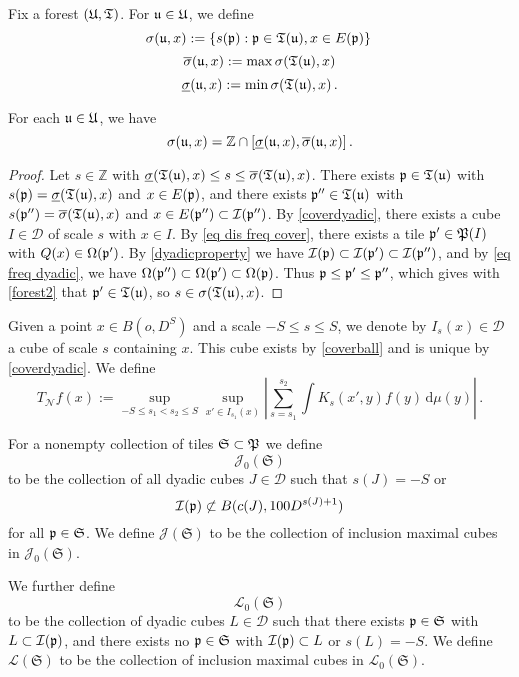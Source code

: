 Fix a forest $(\mathfrak U, \mathfrak T)$.
For $\mathfrak u \in \mathfrak U$, we define
$$
    \sigma (\mathfrak u, x):=\{s(\mathfrak p):\mathfrak p\in \mathfrak T(\mathfrak u), x\in E(\mathfrak p)\}\,
$$
$$
    \overline{\sigma} (\mathfrak u, x) := \max \sigma(\mathfrak T(\mathfrak u), x)
$$
$$
    \underline{\sigma} (\mathfrak u, x) := \min\sigma(\mathfrak T(\mathfrak u), x)\,.
$$
\begin{lemma}
\label{lem sigma convex}
    For each $\mathfrak u \in \mathfrak U$, we have
    $$
        \sigma(\mathfrak u, x) = \mathbb{Z} \cap [\underline{\sigma} (\mathfrak u, x), \overline{\sigma} (\mathfrak u, x)]\,.
    $$
\end{lemma}

\begin{proof}
    Let $s \in \mathbb{Z}$ with $\underline{\sigma} (\mathfrak T(\mathfrak u), x) \le s \le \overline{\sigma} (\mathfrak T(\mathfrak u), x)$. There exists $\mathfrak p \in \mathfrak T(\mathfrak u)$ with $s(\mathfrak p) = \underline{\sigma} (\mathfrak T(\mathfrak u), x)$ and $x \in E(\mathfrak p)$, and there exists $\mathfrak p'' \in \mathfrak T(\mathfrak u)$ with $s(\mathfrak p'') = \overline{\sigma} (\mathfrak T(\mathfrak u), x)$ and $x \in E(\mathfrak p'') \subset \mathcal{I}(\mathfrak p'')$. By \eqref{coverdyadic}, there exists a cube $I \in \mathcal{D}$ of scale $s$ with $x \in I$. By \eqref{eq dis freq cover}, there exists a tile $\mathfrak p' \in \mathfrak P(I)$ with $Q(x) \in \Omega(\mathfrak p')$. By \eqref{dyadicproperty}  we have $\mathcal{I}(\mathfrak p) \subset \mathcal{I}(\mathfrak p') \subset \mathcal{I}(\mathfrak p'')$, and by \eqref{eq freq dyadic}, we have $\Omega(\mathfrak p'') \subset \Omega(\mathfrak p') \subset \Omega(\mathfrak p)$. Thus $\mathfrak p \le \mathfrak p' \le\mathfrak p''$, which gives with \eqref{forest2} that $\mathfrak p' \in \mathfrak T(\mathfrak u)$, so $s \in \sigma(\mathfrak T(\mathfrak u), x)$.
\end{proof}

Given a point $x \in B(o, D^S)$ and a scale $-S \le s\le S$, we denote by $I_s(x) \in \mathcal{D}$ a cube of scale $s$ containing $x$. This cube exists by \eqref{coverball} and is unique by \eqref{coverdyadic}. We define
\begin{equation}
    \label{eq TN def}
    T_{\mathcal{N}} f(x) := \sup_{-S \le s_1 < s_2 \le S} \sup_{x' \in I_{s_1}(x)} \left| \sum_{s = s_1}^{s_2}  \int K_s(x',y) f(y)  \, \mathrm{d}\mu(y) \right|\,.
\end{equation}

For a nonempty collection of tiles $\mathfrak{S} \subset \mathfrak P$ we define
$$
    \mathcal{J}_0(\mathfrak{S})
$$
to be the collection of all dyadic cubes $J \in \mathcal{D}$ such that $s(J) = -S$ or
$$
    \mathcal{I}(\mathfrak p) \not\subset B(c(J), 100D^{s(J) + 1})
$$
for all $\mathfrak p \in \mathfrak{S}$. We define $\mathcal{J}(\mathfrak{S})$ to be the collection of inclusion maximal cubes in $\mathcal{J}_0(\mathfrak{S})$.

We further define
$$
    \mathcal{L}_0(\mathfrak{S})
$$
to be the collection of dyadic cubes $L \in \mathcal{D}$ such that there exists $\mathfrak p \in \mathfrak{S}$ with $L \subset \mathcal{I}(\mathfrak p)$, and there exists no $\mathfrak p \in \mathfrak{S}$ with $\mathcal{I}(\mathfrak p) \subset L$ or $s(L) = -S$. We define $\mathcal{L}(\mathfrak{S})$ to be the collection of inclusion maximal cubes in $\mathcal{L}_0(\mathfrak{S})$.

